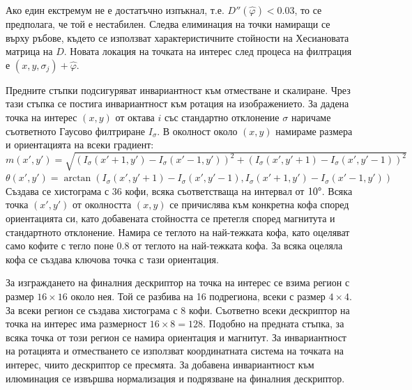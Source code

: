 \documentclass[a4paper,12pt]{article}
\begin{document}
\bigbreak

Ако един екстремум не е достатъчно изпъкнал, т.е. $D''(\hat{\varphi}) < 0.03$, то се предполага, че той е нестабилен. Следва елиминация на точки намиращи се върху ръбове, където се използват характеристичните стойности на Хесиановата матрица на $D$. Новата локация на точката на интерес след процеса на филтрация е $(x, y, \sigma_j) + \hat{\varphi}$.

\bigbreak

Предните стъпки подсигуряват инвариантност към отместване и скалиране. Чрез тази стъпка се постига инвариантност към ротация на изображението. За дадена точка на интерес $(x, y)$ от октава $i$ със стандартно отклонение $\sigma$ наричаме съответното Гаусово филтриране $I_{\sigma}$. В околност около $(x, y)$ намираме размера и ориентацията на всеки градиент: \\

$m(x', y') = \sqrt{(I_{\sigma}(x'+1,y') - I_{\sigma}(x'-1,y'))^2 + (I_{\sigma}(x', y'+1) - I_{\sigma}(x', y'-1))^2}$ \\
$\theta(x', y') = \arctan(I_{\sigma}(x',y'+1) - I_{\sigma}(x',y'-1), I_{\sigma}(x'+1,y') - I_{\sigma}(x'-1, y'))$ \\

Създава се хистограма с 36 кофи, всяка съответстваща на интервал от $10\degree$. Всяка точка $(x', y')$ от околността $(x, y)$ се причислява към конкретна кофа според ориентацията си, като добавената стойността се претегля според магнитута и стандартното отклонение. Намира се теглото на най-тежката кофа, като оцеляват само кофите с тегло поне $0.8$ от теглото на най-тежката кофа. За всяка оцеляла кофа се създава ключова точка с тази ориентация.

\bigbreak

За изграждането на финалния дескриптор на точка на интерес се взима регион с размер $16 \times 16$ около нея. Той се разбива на 16 подрегиона, всеки с размер $4 \times 4$. За всеки регион се създава хистограма с 8 кофи. Съответно всеки дескриптор на точка на интерес има размерност $16 \times 8 = 128$. Подобно на предната стъпка, за всяка точка от този регион се намира ориентация и магнитут. За инвариантност на ротацията и отместването се използват координатната система на точката на интерес, чиито дескриптор се пресмята. За добавена инвариантност към илюминация се извършва нормализация и подрязване на финалния дескриптор.


\end{document}
